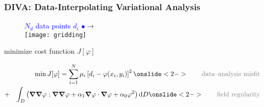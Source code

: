 \begin{frame}[t]
\frametitle{DIVA: Data-Interpolating Variational Analysis}
\footnotesize

\begin{figure}[H]
\textcolor{blue}{$N_{d}$ data points $d_{i}$ $\bullet$}\quad $\rightarrow$ \quad{\textcolor{gray}{gridded field}}\\
\centering
\texttt{[image: gridding]}
\end{figure}

 minimize cost function $J[\varphi]$


\begin{eqnarray*} \label{eqn:divaJ}
& &\min {J}[\varphi] = \sum_{i=1}^{N}\mu_i \left[d_{i}-\varphi(x_{i},y_{i})\right]^{2} \onslide<2->{\qquad\textcolor{gray}{\textrm{data--analysis misfit}}}\\
	  &+& \int_{{D}}\left(
{\nablab}{\nablab}\varphi : {\nablab}{\nablab}\varphi + { \alpha_{1}}
{\nablab}\varphi \cdot {\nablab}\varphi + \alpha_{0} \varphi^{2} \right) \ddiff {D} \onslide<2->{\qquad\textcolor{gray}{\textrm{field regularity}}}
\end{eqnarray*}

\end{frame}


